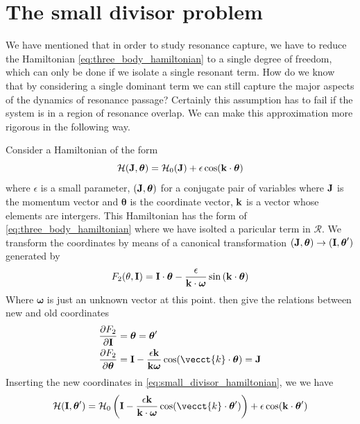 \section{The small divisor problem}
\label{sec:small_divisor}
We have mentioned that in order to study resonance capture, we have
to reduce the Hamiltonian \ref{eq:three_body_hamiltonian} to a 
single degree of freedom, which can only be done if we isolate 
a single resonant term. How do we know that by considering a single
dominant term we can still capture the major aspects of the dynamics
of resonance passage? Certainly this assumption has to fail if
the system is in a region of resonance overlap. We can make this 
approximation more rigorous in the following way.

Consider a Hamiltonian of the form
\begin{equation}
    \mathcal{H}(\boldsymbol{\mathbf{J}},\boldsymbol{\theta})=\mathcal{H}_0(\boldsymbol{\mathbf{J}})+
    \epsilon\cos(\boldsymbol{\mathbf{k}}\cdot\boldsymbol{\theta})
    \label{eq:small_divisor_hamiltonian}
\end{equation}
where $\epsilon$ is a small parameter, $(\boldsymbol{\mathbf{J}},\boldsymbol{\theta})$
for a conjugate pair of variables where $\boldsymbol{\mathbf{J}}$ is the momentum
vector and $\boldsymbol{\theta}$ is the coordinate vector, $\boldsymbol{\mathbf{k}}$ is
a vector whose elements are intergers. This Hamiltonian has the form of
\cref{eq:three_body_hamiltonian} where we have isolted a paricular term
in $\mathcal{R}$. We transform the coordinates
by means of a canonical transformation $(\boldsymbol{\mathbf{J}},\boldsymbol{\theta})
\rightarrow (\boldsymbol{\mathbf{I}},\boldsymbol{\theta}')$ generated by
\begin{equation}
    F_2(\theta, \boldsymbol{\mathbf{I}})=\boldsymbol{\mathbf{I}}\cdot\boldsymbol{\theta}
    - \frac{\epsilon}{\boldsymbol{\mathbf{k}}\cdot\boldsymbol{\omega}} \sin{(\boldsymbol{\mathbf{k}}\cdot
    \boldsymbol{\theta})}
\end{equation}
Where $\boldsymbol{\omega}$ is just an unknown vector at this point.
 then give the relations between new and old
coordinates
\begin{align}
    \frac{\partial F_2}{\partial \vect{I}} &=\boldsymbol{\theta}
    =\boldsymbol{\theta}'\\
    \frac{\partial F_2}{\partial \boldsymbol{\theta}}&=\vect{I}
    - \frac{\epsilon\vect{k}}{\vect{k}\boldsymbol{\omega}}\cos
    (\vecct{k}\cdot\boldsymbol{\theta})=\vect{J}\label{
        eq:small_divisor}
\end{align}
Inserting the new coordinates in \cref{eq:small_divisor_hamiltonian}, we
we have
\begin{equation}
    \mathcal{H}(\vect{I},\boldsymbol{\theta}')=\mathcal{H}_0\left(
\vect{I} - \frac{\epsilon\vect{k}}{\vect{k}\cdot\boldsymbol{\omega}}\cos
    (\vecct{k}\cdot\boldsymbol{\theta}')\right) +\epsilon\cos
    (\vect{k}\cdot\boldsymbol{\theta}')
\end{equation}

